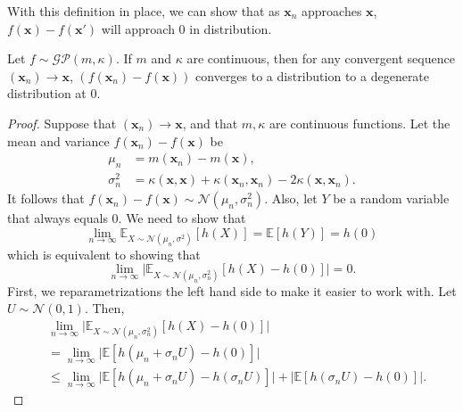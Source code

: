 With this definition in place, we can show that as $\mathbf{x}_n$ approaches $\mathbf{x}$, $f(\mathbf{x}) - f(\mathbf{x}')$ will approach 0 in distribution.
\begin{theorem}
    Let $f \sim \mathcal{GP}(m, \kappa)$.
    If $m$ and $\kappa$ are continuous, then for any convergent sequence $(\mathbf{x}_n) \to \mathbf{x}$, $(f(\mathbf{x}_n) - f(\mathbf{x}))$ converges to a distribution to a degenerate distribution at 0.
\end{theorem}
\begin{proof}
    Suppose that $(\mathbf{x}_n) \to \mathbf{x}$, and that $m, \kappa$ are continuous functions.
    Let the mean and variance $f(\mathbf{x}_n) - f(\mathbf{x})$ be
    \begin{align*}
        \mu_n & = m(\mathbf{x}_n) - m(\mathbf{x}), \\
        \sigma_n^2 & = \kappa(\mathbf{x}, \mathbf{x}) + \kappa(\mathbf{x}_n, \mathbf{x}_n) - 2\kappa(\mathbf{x}, \mathbf{x}_n).
    \end{align*}
    It follows that $f(\mathbf{x}_n) -f(\mathbf{x}) \sim \mathcal{N}(\mu_n, \sigma^2_n)$.
    Also, let $Y$ be a random variable that always equals 0.
    We need to show that
    \begin{equation*}
        \lim_{n \to \infty}\mathbb{E}_{X \sim \mathcal{N}(\mu_n, \sigma^2)}[h(X)] = \mathbb{E}[h(Y)] = h(0)
    \end{equation*}
    which is equivalent to showing that
    \begin{equation*}
        \lim_{n \to \infty} \lvert \mathbb{E}_{X \sim \mathcal{N}(\mu_n, \sigma_n^2)}[h(X) - h(0)] \rvert = 0.
    \end{equation*}
    First, we reparametrizations the left hand side to make it easier to work with.
    Let $U \sim \mathcal{N}(0, 1)$.
    Then,
    \begin{align*}
        & \lim_{n \to \infty} \lvert \mathbb{E}_{X \sim \mathcal{N}(\mu_n, \sigma_n^2)}[h(X) - h(0)] \rvert \\
        & =
        \lim_{n \to \infty} \lvert \mathbb{E}[h(\mu_n + \sigma_n U) - h(0)] \rvert \\
        & \leq
        \lim_{n \to \infty}
        \lvert \mathbb{E}[h(\mu_n + \sigma_n U) - h(\sigma_n U)] \rvert
        +
        \lvert \mathbb{E}[h(\sigma_nU) - h(0)] \rvert.
    \end{align*}


\end{proof}
